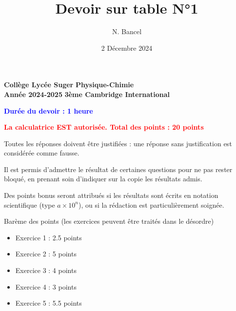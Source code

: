 \documentclass[answers]{exam}
\title{Devoir sur table N°1}
\author{N. Bancel}
\date{2 Décembre 2024}
\begin{document}
\textbf{Collège Lycée Suger}
\hfill
\textbf{Physique-Chimie} \\

\textbf{Année 2024-2025}
\hfill
\textbf{3ème Cambridge International} \par

{\let\newpage\relax\maketitle}


  \begin{center}
    \textbf{\textcolor{blue}{Durée du devoir : 1 heure}} \par
    \vspace{1em}
    \textbf{\textcolor{red}{La calculatrice EST autorisée. Total des points : 20 points}} \par
    \vspace{1em}
  \end{center}
  
  \begin{tcolorbox}[colback=gray!10!white, colframe=gray, title=Note importante]
    Toutes les réponses doivent être justifiées : une réponse sans justification est considérée comme fausse. \par
    \vspace{1em}
    Il est permis d'admettre le résultat de certaines questions pour ne pas rester bloqué, en prenant soin d'indiquer sur la copie les résultats admis. \par
    \vspace{1em}
    Des points bonus seront attribués si les résultats sont écrits en notation scientifique (type $a \times 10^n$), ou si la rédaction est particulièrement soignée. \par
    \vspace{1em}
    Barème des points (les exercices peuvent être traités dans le désordre)
    \begin{itemize}[noitemsep]
      \item Exercice 1 : 2.5 points
      \item Exercice 2 : 5 points
      \item Exercice 3 : 4 points
      \item Exercice 4 : 3 points
      \item Exercice 5 : 5.5 points
  \end{itemize}
  \end{tcolorbox}
\end{document}
